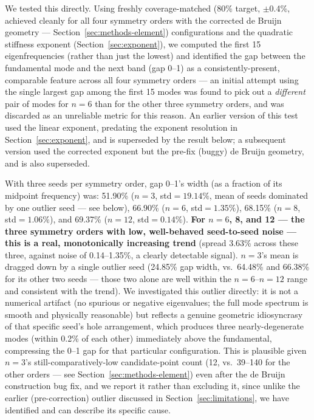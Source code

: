 \documentclass[11pt]{article}
\begin{document}
We tested this directly. Using freshly coverage-matched (80\% target, $\pm$0.4\%, achieved cleanly for all four symmetry orders with the corrected de Bruijn geometry --- Section~\ref{sec:methods-element}) configurations and the quadratic stiffness exponent (Section~\ref{sec:exponent}), we computed the first 15 eigenfrequencies (rather than just the lowest) and identified the gap between the fundamental mode and the next band (gap 0--1) as a consistently-present, comparable feature across all four symmetry orders --- an initial attempt using the single largest gap among the first 15 modes was found to pick out a \textit{different} pair of modes for $n=6$ than for the other three symmetry orders, and was discarded as an unreliable metric for this reason. An earlier version of this test used the linear exponent, predating the exponent resolution in Section~\ref{sec:exponent}, and is superseded by the result below; a subsequent version used the corrected exponent but the pre-fix (buggy) de Bruijn geometry, and is also superseded.

With three seeds per symmetry order, gap 0--1's width (as a fraction of its midpoint frequency) was: 51.90\% ($n=3$, std$=19.14\%$, mean of seeds dominated by one outlier seed --- see below), 66.90\% ($n=6$, std$=1.35\%$), 68.15\% ($n=8$, std$=1.06\%$), and 69.37\% ($n=12$, std$=0.14\%$). \textbf{For $n=6$, 8, and 12 --- the three symmetry orders with low, well-behaved seed-to-seed noise --- this is a real, monotonically increasing trend} (spread 3.63\% across these three, against noise of 0.14--1.35\%, a clearly detectable signal). $n=3$'s mean is dragged down by a single outlier seed (24.85\% gap width, vs.\ 64.48\% and 66.38\% for its other two seeds --- those two alone are well within the $n=6$--$n=12$ range and consistent with the trend). We investigated this outlier directly: it is not a numerical artifact (no spurious or negative eigenvalues; the full mode spectrum is smooth and physically reasonable) but reflects a genuine geometric idiosyncrasy of that specific seed's hole arrangement, which produces three nearly-degenerate modes (within 0.2\% of each other) immediately above the fundamental, compressing the 0--1 gap for that particular configuration. This is plausible given $n=3$'s still-comparatively-low candidate-point count (12, vs.\ 39--140 for the other orders --- see Section~\ref{sec:methods-element}) even after the de Bruijn construction bug fix, and we report it rather than excluding it, since unlike the earlier (pre-correction) outlier discussed in Section~\ref{sec:limitations}, we have identified and can describe its specific cause.
\end{document}

